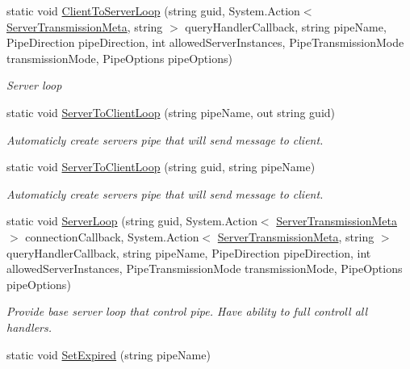 \begin{DoxyCompactItemize}
static void \mbox{\hyperlink{class_pipes_provider_1_1_a_p_i_a9eacd5177e24badabe5ac8a3fe30d5d3}{Client\+To\+Server\+Loop}} (string guid, System.\+Action$<$ \mbox{\hyperlink{class_pipes_provider_1_1_server_transmission_meta}{Server\+Transmission\+Meta}}, string $>$ query\+Handler\+Callback, string pipe\+Name, Pipe\+Direction pipe\+Direction, int allowed\+Server\+Instances, Pipe\+Transmission\+Mode transmission\+Mode, Pipe\+Options pipe\+Options)
\begin{DoxyCompactList}\small\item\em Server loop \end{DoxyCompactList}\item 
static void \mbox{\hyperlink{class_pipes_provider_1_1_a_p_i_a793d388ee138476bcea3256146851432}{Server\+To\+Client\+Loop}} (string pipe\+Name, out string guid)
\begin{DoxyCompactList}\small\item\em Automaticly create server\textquotesingle{}s pipe that will send message to client. \end{DoxyCompactList}\item 
static void \mbox{\hyperlink{class_pipes_provider_1_1_a_p_i_ae24aa9b5d3220b373d5689bddc22e924}{Server\+To\+Client\+Loop}} (string guid, string pipe\+Name)
\begin{DoxyCompactList}\small\item\em Automaticly create server\textquotesingle{}s pipe that will send message to client. \end{DoxyCompactList}\item 
static void \mbox{\hyperlink{class_pipes_provider_1_1_a_p_i_ab18891bb1d9c04a9c9144e0d8c89aebf}{Server\+Loop}} (string guid, System.\+Action$<$ \mbox{\hyperlink{class_pipes_provider_1_1_server_transmission_meta}{Server\+Transmission\+Meta}} $>$ connection\+Callback, System.\+Action$<$ \mbox{\hyperlink{class_pipes_provider_1_1_server_transmission_meta}{Server\+Transmission\+Meta}}, string $>$ query\+Handler\+Callback, string pipe\+Name, Pipe\+Direction pipe\+Direction, int allowed\+Server\+Instances, Pipe\+Transmission\+Mode transmission\+Mode, Pipe\+Options pipe\+Options)
\begin{DoxyCompactList}\small\item\em Provide base server loop that control pipe. Have ability to full controll all handlers. \end{DoxyCompactList}\item 
static void \mbox{\hyperlink{class_pipes_provider_1_1_a_p_i_ab525aaa0c87f23cfbe4ad6d0ed1b1b4c}{Set\+Expired}} (string pipe\+Name)

\end{DoxyCompactItemize}
